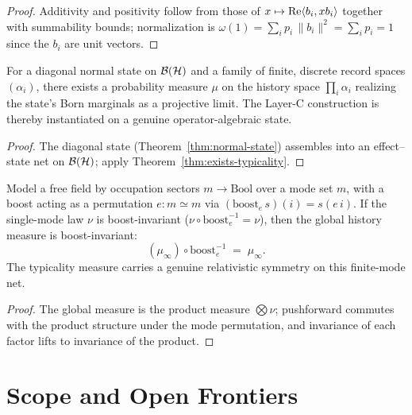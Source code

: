 \begin{proof}
  \leanok
  Additivity and positivity follow from those of $x \mapsto \operatorname{Re}\langle b_i, x b_i\rangle$
  together with summability bounds; normalization is
  $\omega(1) = \sum_i p_i \,\|b_i\|^2 = \sum_i p_i = 1$ since the $b_i$ are unit
  vectors.
\end{proof}

\begin{theorem}
  \label{thm:bh-typicality}
  \leanok
  For a diagonal normal state on $\mathcal{B}(\mathcal{H})$ and a family of finite, discrete record
  spaces $(\alpha_i)$, there exists a probability measure $\mu$ on the history space
  $\prod_i \alpha_i$ realizing the state's Born marginals as a projective limit.
  The Layer-C construction is thereby instantiated on a genuine operator-algebraic
  state.
\end{theorem}

\begin{proof}
  \leanok
  The diagonal state (Theorem~\ref{thm:normal-state}) assembles into an
  effect--state net on $\mathcal{B}(\mathcal{H})$; apply Theorem~\ref{thm:exists-typicality}.
\end{proof}

\begin{theorem}
  \label{thm:freefield-boost}
  \leanok
  Model a free field by occupation sectors $m \to \mathrm{Bool}$ over a mode set $m$,
  with a boost acting as a permutation $e : m \simeq m$ via
  $(\mathrm{boost}_e\, s)(i) = s(e\,i)$. If the single-mode law $\nu$ is
  boost-invariant ($\nu \circ \mathrm{boost}_e^{-1} = \nu$), then the global
  history measure is boost-invariant:
  \[
    (\mu_\infty)\circ \mathrm{boost}_e^{-1} \;=\; \mu_\infty .
  \]
  The typicality measure carries a genuine relativistic symmetry on this
  finite-mode net.
\end{theorem}

\begin{proof}
  \leanok
  The global measure is the product measure $\bigotimes \nu$; pushforward commutes
  with the product structure under the mode permutation, and invariance of each
  factor lifts to invariance of the product.
\end{proof}


\chapter{Scope and Open Frontiers}

